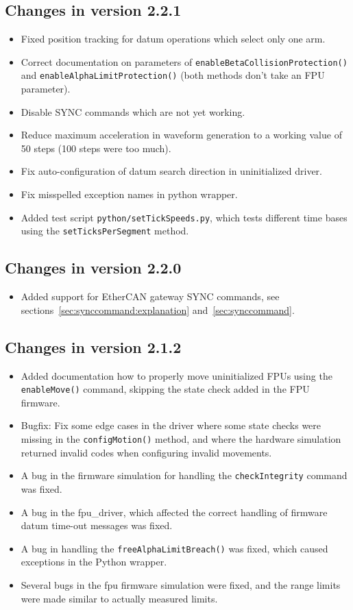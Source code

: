 \documentclass[fontsize=12,a4paper]{scrreprt}
\begin{document}
\subsection*{Changes in version 2.2.1}
\begin{itemize}
\item Fixed position tracking for datum operations
  which select only one arm.
\item Correct documentation on parameters of \texttt{enableBetaCollisionProtection()}
  and \texttt{enableAlphaLimitProtection()} (both methods don't take an
  FPU parameter).
\item Disable SYNC commands which are not yet working.
\item Reduce maximum acceleration in waveform generation to
  a working value of 50 steps (100 steps were too much).
\item Fix auto-configuration of datum search direction
  in uninitialized driver.
\item Fix misspelled exception names in python wrapper.
\item Added test script \texttt{python/setTickSpeeds.py}, which tests
  different time bases using the \texttt{setTicksPerSegment} method.
\end{itemize}


\subsection*{Changes in version 2.2.0}
\begin{itemize}
\item Added support for EtherCAN gateway SYNC commands, see
  sections~\ref{sec:synccommand:explanation} and~\ref{sec:synccommand}.
\end{itemize}


\subsection*{Changes in version 2.1.2}
\begin{itemize}
\item Added documentation how to properly move uninitialized FPUs
  using the \texttt{enableMove()} command, skipping the state check
  added in the FPU firmware.
\item Bugfix: Fix some edge cases in the driver where some state
  checks were missing in the \texttt{configMotion()} method, and where
  the hardware simulation returned invalid codes when configuring
  invalid movements.
\item A bug in the firmware simulation for handling the
  \texttt{checkIntegrity} command was fixed.
\item A bug in the fpu\_driver, which affected the correct handling of
  firmware datum time-out messages was fixed.
\item A bug in handling the \texttt{freeAlphaLimitBreach()} was
  fixed, which caused exceptions in the Python wrapper.
\item Several bugs in the fpu firmware simulation were fixed, and the
  range limits were made similar to actually measured limits.
\end{itemize}
\end{document}
